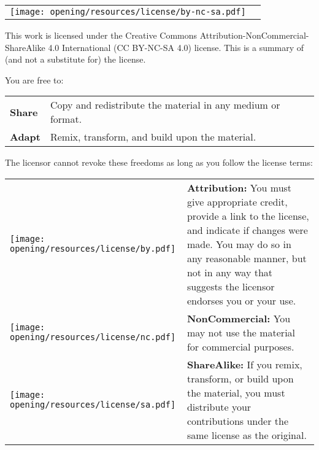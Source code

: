     \begingroup
    \renewcommand{\baselinestretch}{1.2}\footnotesize  %
    \noindent
    \begin{tabular}{m{3.5cm} m{11.5cm}}
        \texttt{[image: opening/resources/license/by-nc-sa.pdf]} & \vspace*{\fill}{\normalsize {\thesisAuthor},} \newline {\normalsize{\thesisTutor}} \vspace*{\fill}\\
    \end{tabular}
    \endgroup 
    
    \noindent This work is licensed under the Creative Commons Attribution-NonCommercial-ShareAlike 4.0 International (CC BY-NC-SA 4.0) license. This is a summary of (and not a substitute for) the license. 
    
    \vspace{1mm}
    
    \noindent   You are free to:

    \vspace{1mm}
    
    \noindent
    \begin{tabular}{m{1.5cm} m{13.5cm}}
        \textbf{Share} & Copy and redistribute the material in any medium or format.\\
        \textbf{Adapt} & Remix, transform, and build upon the material.\\
    \end{tabular}
    
    \vspace{1mm}
    
    \noindent The licensor cannot revoke these freedoms as long as you follow the license terms:
    
    \noindent
    \begin{tabular}{m{1.5cm} m{13.5cm}}
        \texttt{[image: opening/resources/license/by.pdf]} & \textbf{Attribution:} You must give appropriate credit, provide a link to the license, and indicate if changes were made. You may do so in any reasonable manner, but not in any way that suggests the licensor endorses you or your use.\\
        \texttt{[image: opening/resources/license/nc.pdf]} & \textbf{NonCommercial:} You may not use the material for commercial purposes.\\
        \texttt{[image: opening/resources/license/sa.pdf]} & \textbf{ShareAlike:} If you remix, transform, or build upon the material, you must distribute your contributions under the same license as the original.
    \end{tabular}
    
